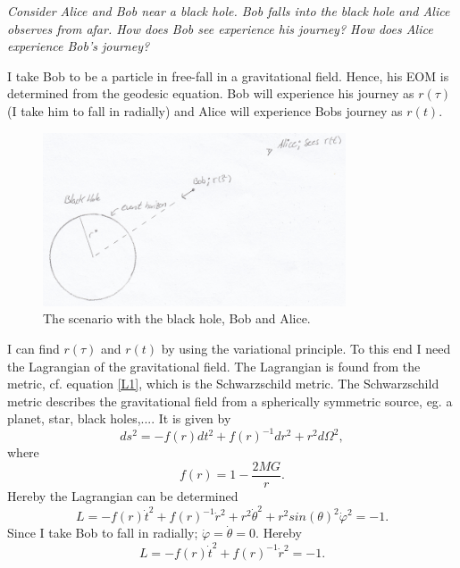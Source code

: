 \begin{example}
	\emph{Consider Alice and Bob near a black hole. Bob falls into the black hole and Alice observes from afar. How does Bob see experience his journey? How does Alice experience Bob's journey?}\newline
	
	I take Bob to be a particle in free-fall in a gravitational field. Hence, his EOM is determined from the geodesic equation. Bob will experience his journey as $r(\tau)$ (I take him to fall in radially) and Alice will experience Bobs journey as $r(t)$. 
	\begin{figure}[H]
		\captionsetup{width=1\textwidth}
		\centering
		\includegraphics[width=0.8\textwidth]{figures//bh}
		\caption{The scenario with the black hole, Bob and Alice.}
		\label{fig:bh}
	\end{figure} 
	I can find $r(\tau)$ and $r(t)$ by using the variational principle. To this end I need the Lagrangian of the gravitational field. The Lagrangian is found from the metric, cf. equation \eqref{L1}, which is the Schwarzschild metric. The Schwarzschild metric describes the gravitational field from a spherically symmetric source, eg. a planet, star, black holes,.... It is given by
	\begin{equation}
		ds^2=-f(r)dt^2+f(r)^{-1}dr^2+r^2d\Omega^2,
	\end{equation} 
	where
	\begin{equation}
		f(r)=1-\frac{2MG}{r}.
	\end{equation}  
	Hereby the Lagrangian can be determined
	\begin{equation}
		L=-f(r)\dot{t}^2+f(r)^{-1}\dot{r}^2+r^2\dot{\theta}^2+r^2sin(\theta)^2\dot{\varphi}^2=-1.
	\end{equation} 
	Since I take Bob to fall in radially; $\dot{\varphi}=\dot{\theta}=0$. Hereby
	\begin{equation}
		L=-f(r)\dot{t}^2+f(r)^{-1}\dot{r}^2=-1.
	\end{equation} 

\end{example}
